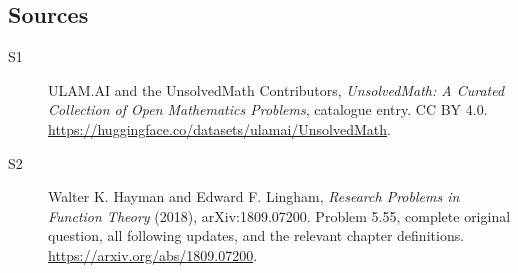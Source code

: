\documentclass[11pt]{book}
\begin{document}
\subsection{Sources}
\begin{description}
\item[\hypertarget{source:statement:1}{S1}] ULAM.AI and the UnsolvedMath Contributors, \emph{UnsolvedMath: A Curated Collection of Open Mathematics Problems}, catalogue entry. CC BY 4.0. \url{https://huggingface.co/datasets/ulamai/UnsolvedMath}.
\item[\hypertarget{source:statement:2}{S2}] Walter K. Hayman and Edward F. Lingham, \emph{Research Problems in Function Theory} (2018), arXiv:1809.07200. Problem 5.55, complete original question, all following updates, and the relevant chapter definitions. \url{https://arxiv.org/abs/1809.07200}.
\end{description}
\label{end:statement}
\end{document}
